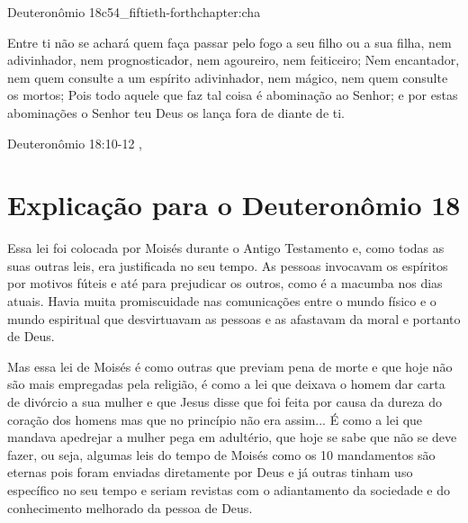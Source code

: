 \begin{chapterpage}{Deuteronômio 18}{c54_fiftieth-forthchapter:cha}
 
\begin{myquotation}Entre ti não se achará quem faça passar pelo fogo a seu filho ou a sua filha, nem adivinhador, nem prognosticador, nem agoureiro, nem feiticeiro;
Nem encantador, nem quem consulte a um espírito adivinhador, nem mágico, nem quem consulte os mortos;
Pois todo aquele que faz tal coisa é abominação ao Senhor; e por estas abominações o Senhor teu Deus os lança fora de diante de ti.
\par\vspace*{15mm}
\mbox{}\hfill \emdash{}Deuteronômio 18:10-12
, %
\par\end{myquotation}

\end{chapterpage}



\section{Explicação para o Deuteronômio 18}\label{c1_basicformatting:sec}

\emdash{}Essa lei foi colocada por Moisés durante o Antigo Testamento e, como todas as suas outras leis, era justificada no seu tempo. As pessoas invocavam os espíritos por motivos fúteis e até para prejudicar os outros, como é a macumba nos dias atuais. Havia muita promiscuidade nas comunicações entre o mundo físico e o mundo espiritual que desvirtuavam as pessoas e as afastavam da moral e portanto de Deus.

\emdash{}Mas essa lei de Moisés é como outras que previam pena de morte e que hoje não são mais empregadas pela religião, é como a lei que deixava o homem dar carta de divórcio a sua mulher e que Jesus disse que foi feita por causa da dureza do coração dos homens mas que no princípio não era assim... É como a lei que mandava apedrejar a mulher pega em adultério, que hoje se sabe que não se deve fazer, ou seja, algumas leis do tempo de Moisés como os 10 mandamentos são eternas pois foram enviadas diretamente por Deus e já outras tinham uso específico no seu tempo e seriam revistas com o adiantamento da sociedade e do conhecimento melhorado da pessoa de Deus.

